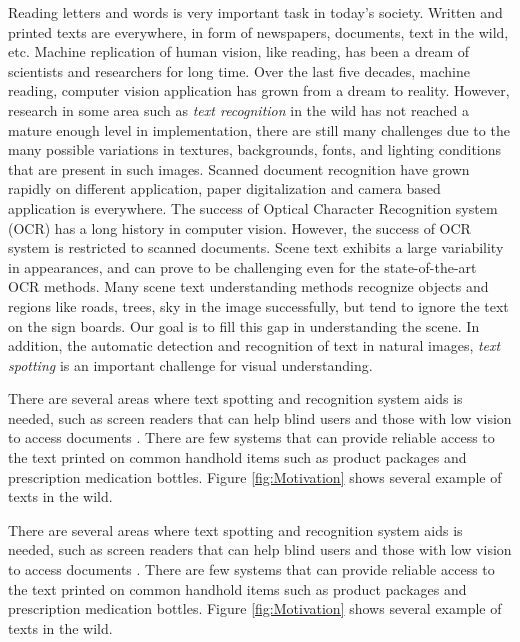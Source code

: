 \documentclass[phd,tocprelim]{cornell}
\begin{document}
Reading letters and words is very important task in today’s society. Written and printed texts are everywhere, in form of newspapers, documents, text in the wild, etc. Machine replication of human vision, like reading, has been a dream of scientists and researchers for long time. Over the last five decades, machine reading, computer vision application has grown from a dream to reality. However, research in some area such as \textit{text recognition} in the wild has not reached a mature enough level in implementation, there are still many challenges due to the many possible variations in textures, backgrounds, fonts, and lighting conditions that are present in such images. Scanned document recognition have grown rapidly on different application, paper digitalization and camera based application is everywhere. The success of Optical Character Recognition system (OCR) has a long history in computer vision. However, the success of OCR system is restricted to scanned documents. Scene text exhibits a large variability in appearances, and can prove to be challenging even for the state-of-the-art OCR methods. Many scene text understanding methods recognize objects and regions like roads, trees, sky in the image successfully, but tend to ignore the text on the sign boards. Our goal is to fill this gap in understanding the scene. In addition, the automatic detection and recognition of text in natural images, \textit{text spotting }is an important challenge for visual understanding. 

There are several areas where text spotting and recognition system aids is needed, such as screen readers that can help blind users and those with low vision to access documents \cite{nazma2016camera}. There are few systems \cite{merler2007recognizing,rajkumar2014portable} that can provide reliable access to the text printed on common handhold items such as product packages and prescription medication bottles. Figure \ref{fig:Motivation} shows several example of texts in the wild.



There are several areas where text spotting and recognition system aids is needed, such as screen readers that can help blind users and those with low vision to access documents \cite{nazma2016camera}. There are few systems \cite{merler2007recognizing,rajkumar2014portable} that can provide reliable access to the text printed on common handhold items such as product packages and prescription medication bottles. Figure \ref{fig:Motivation} shows several example of texts in the wild. 
\end{document}
